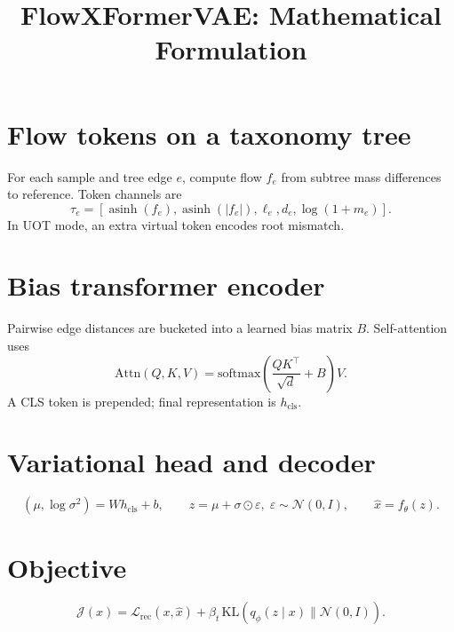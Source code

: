 \documentclass[11pt]{article}
\title{FlowXFormerVAE: Mathematical Formulation}
\date{}
\begin{document}
\maketitle

\section{Flow tokens on a taxonomy tree}
For each sample and tree edge $e$, compute flow $f_e$ from subtree mass differences to reference.
Token channels are
\begin{equation}
\tau_e=[\operatorname{asinh}(f_e),\operatorname{asinh}(|f_e|),\ell_e,d_e,\log(1+m_e)].
\end{equation}
In UOT mode, an extra virtual token encodes root mismatch.

\section{Bias transformer encoder}
Pairwise edge distances are bucketed into a learned bias matrix $B$.
Self-attention uses
\begin{equation}
\mathrm{Attn}(Q,K,V)=\mathrm{softmax}\!\left(\frac{QK^\top}{\sqrt d}+B\right)V.
\end{equation}
A CLS token is prepended; final representation is $h_{\mathrm{cls}}$.

\section{Variational head and decoder}
\begin{equation}
(\mu,\log\sigma^2)=W h_{\mathrm{cls}}+b,
\qquad
z=\mu+\sigma\odot\varepsilon,\;\varepsilon\sim\mathcal N(0,I),
\qquad
\hat x=f_\theta(z).
\end{equation}

\section{Objective}
\begin{equation}
\mathcal J(x)=\mathcal L_{\mathrm{rec}}(x,\hat x)+\beta_t\,\mathrm{KL}(q_\phi(z\mid x)\|\mathcal N(0,I)).
\end{equation}
\end{document}
